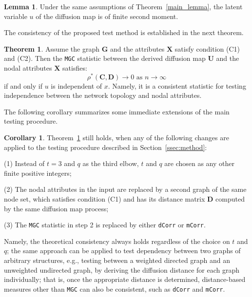 \documentclass[12pt]{article}
\theoremstyle{definition}
\newtheorem{theorem}{Theorem}
\newtheorem{corollary}{Corollary}
\newtheorem{lemma}{Lemma}
\begin{document}
	\begin{lemma}
		\label{main_lemma_1}
		Under the same assumptions of Theorem~\ref{main_lemma}, the latent variable $u$ of the diffusion map is of finite second moment. 
	\end{lemma} 
	
	The consistency of the proposed test method is established in the next theorem.
	
	\begin{theorem}
		Assume the graph $\mathbf{G}$ and the attributes $\mathbf{X}$ satisfy condition (C1) and (C2). Then the \texttt{MGC} statistic between the derived diffusion map $\mathbf{U}$ and the nodal attributes $\mathbf{X}$ satisfies:
		\begin{equation}
		\rho^{*}(\mathbf{C}, \mathbf{D}) \longrightarrow 0 \mbox{ as } n \rightarrow \infty
		\end{equation}
		if and only if $u$ is independent of $x$. Namely, it is a consistent statistic for testing independence between the network topology and nodal attributes.
		\label{theoremMain}
	\end{theorem} 
	
	The following corollary summarizes some immediate extensions of the main testing procedure.
	
	\begin{corollary}
		\label{main_corollary}
		Theorem~\ref{theoremMain} still holds, when any of the following changes are applied to the testing procedure described in Section~\ref{ssec:method}:
		\begin{description}[align=left]
			\item [] (1) Instead of $t=3$ and $q$ as the third elbow, $t$ and $q$ are chosen as any other finite positive integers;
			
			\item [] (2) The nodal attributes in the input are replaced by a second graph of the same node set, which satisfies condition (C1) and has its distance matrix $\mathbf{D}$ computed by the same diffusion map process;
			
			\item [] (3) The \texttt{MGC} statistic in step 2 is replaced by either \texttt{dCorr} or \texttt{mCorr}.
		\end{description}
	\end{corollary}
	
	Namely, the theoretical consistency always holds regardless of the choice on $t$ and $q$; the same approach can be applied to test dependency between two graphs of arbitrary structures, e.g., testing between a weighted directed graph and an unweighted undirected graph, by deriving the diffusion distance for each graph individually; that is, once the appropriate distance is determined, distance-based measures other than \texttt{MGC} can also be consistent, such as \texttt{dCorr} and \texttt{mCorr}. 
	
\end{document}
